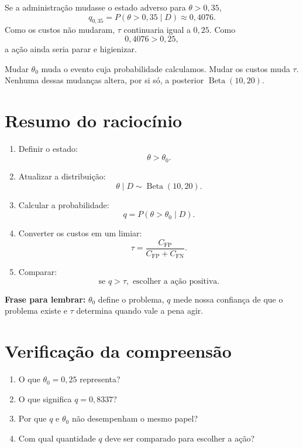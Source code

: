 \documentclass[11pt,letter]{article}
\newcommand{\CFP}{C_{\mathrm{FP}}}
\newcommand{\CFN}{C_{\mathrm{FN}}}
\begin{document}
Se a administração mudasse o estado adverso para $\theta>0{,}35$,
\[
q_{0{,}35}=P(\theta>0{,}35\mid D)\approx0{,}4076.
\]
Como os custos não mudaram, $\tau$ continuaria igual a $0{,}25$. Como
\[
0{,}4076>0{,}25,
\]
a ação ainda seria parar e higienizar.

\begin{atencao}
Mudar $\theta_0$ muda o evento cuja probabilidade calculamos. Mudar os custos
muda $\tau$. Nenhuma dessas mudanças altera, por si só, a posterior
$\operatorname{Beta}(10,20)$.
\end{atencao}

\section{Resumo do raciocínio}

\begin{enumerate}
  \item Definir o estado:
        \[
        \theta>\theta_0.
        \]

  \item Atualizar a distribuição:
        \[
        \theta\mid D\sim\operatorname{Beta}(10,20).
        \]

  \item Calcular a probabilidade:
        \[
        q=P(\theta>\theta_0\mid D).
        \]

  \item Converter os custos em um limiar:
        \[
        \tau=\frac{\CFP}{\CFP+\CFN}.
        \]

  \item Comparar:
        \[
        \text{se }q>\tau,\text{ escolher a ação positiva.}
        \]
\end{enumerate}

\begin{ideia}
\textbf{Frase para lembrar:} $\theta_0$ define o problema, $q$ mede nossa
confiança de que o problema existe e $\tau$ determina quando vale a pena agir.
\end{ideia}

\section{Verificação da compreensão}

\begin{enumerate}
  \item O que $\theta_0=0{,}25$ representa?
  \item O que significa $q=0{,}8337$?
  \item Por que $q$ e $\theta_0$ não desempenham o mesmo papel?
  \item Com qual quantidade $q$ deve ser comparado para escolher a ação?
\end{enumerate}
\end{document}
